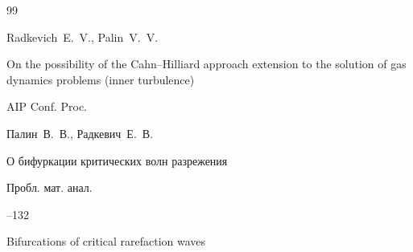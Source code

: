 \begin{thebibliography}{99}
























\by Radkevich~E.~V., Palin~V.~V.

\paper On the possibility of the Cahn--Hilliard approach extension to the solution of gas dynamics problems (inner turbulence)

\jour AIP Conf. Proc.









\by Палин~В.~В., Радкевич~Е.~В.

\paper О бифуркации критических волн разрежения

\jour Пробл. мат. анал.



--132

\transl

\paper  Bifurcations of critical rarefaction waves


\end{thebibliography}
